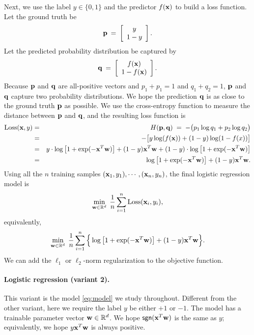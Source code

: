 \documentclass[11pt]{article}
\numberwithin{equation}{section}
\def\pp{{\bf p}}
\def\q{{\bf q}}
\def\w{{\bf w}}
\def\x{{\bf x}}
\def\RB{{\mathbb R}}
\def\sgn{\mathsf{sgn}}
\begin{document}
Next, we use the label $y \in \{0, 1\}$ and the predictor $f (\x)$ to build a loss function.
Let the ground truth be 
\begin{equation*}
\pp \: = \: 
\left[
\begin{array}{c}
y \\
1-y \\
\end{array}
\right].
\end{equation*}
Let the predicted probability distribution be captured by
\begin{equation*}
\q \: = \: 
\left[
\begin{array}{c}
f (\x) \\
1 - f (\x) \\
\end{array}
\right] .
\end{equation*}
Because $\pp$ and $\q$ are all-positive vectors and $p_1 + p_1 = 1$ and $q_1 + q_2 = 1$,
$\pp$ and $\q$ capture two probability  distributions.
We hope the prediction $\q$ is as close to the ground truth $\pp$ as possible.
We use the cross-entropy function to measure the distance between $\pp$ and $\q$,
and the resulting loss function is
\begin{eqnarray*}
\textrm{Loss} (\x, y)
& = & H (\pp , \q )
\; = \; - \big( p_1 \log q_1 + p_2 \log q_2 \big) \\
& = & - \big[ y \log (f(\x)) + (1-y) \log (1-f(x))  \big] \\
& = & y \cdot \log \big[ 1 + \exp (-\x^T \w) \big]
+ (1-y) \x^T \w + (1- y) \cdot \log \big[ 1 + \exp (-\x^T \w)  \big] \\
& = & \log \big[ 1 + \exp (-\x^T \w) \big] + (1-y)  \x^T \w .
\end{eqnarray*}
Using all the $n$ training samples $(\x_1, y_1), \cdots , (\x_n, y_n)$, the final logistic regression model is
\begin{equation*}
\min_{\w \in \RB^d} \; \frac{1}{n} \sum_{i=1}^{n} \textrm{Loss} (\x_i, y_i ) ,
\end{equation*}
equivalently, 
\begin{equation} \label{eq:model1}
\min_{\w \in \RB^d} \; \frac{1}{n} \sum_{i=1}^{n} 
\Big\{ \log \big[ 1 + \exp (-\x^T \w) \big]  + (1-y)  \x^T \w \Big\} .
\end{equation}
We can add the $\ell_1$ or $\ell_2$-norm regularization to the objective function.


\paragraph{Logistic regression (variant 2).}
This variant is the model \eqref{eq:model} we study throughout.
Different from the other variant, here we require the label $y$ be either $+1$ or $-1$.
The model has a trainable parameter vector $\w \in \RB^d$.
We hope $\sgn (\x^T \w )$ is the same as $y$;
equivalently, we hope $y \x^T \w$ is always positive.
\end{document}

